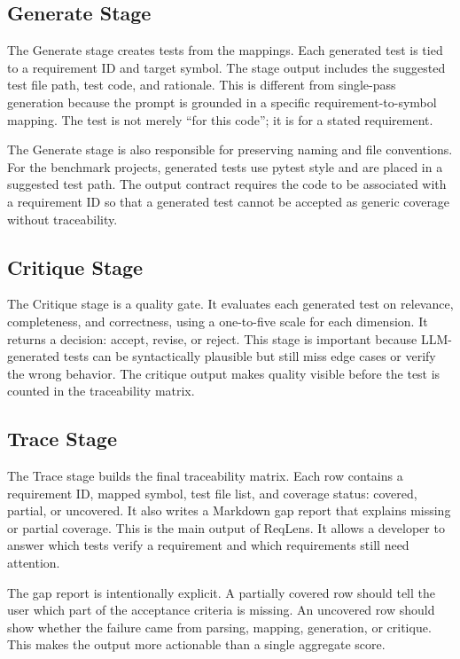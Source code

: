 \documentclass[conference]{IEEEtran}
\begin{document}
\subsection{Generate Stage}
The Generate stage creates tests from the mappings. Each generated test is tied
to a requirement ID and target symbol. The stage output includes the suggested
test file path, test code, and rationale. This is different from single-pass
generation because the prompt is grounded in a specific requirement-to-symbol
mapping. The test is not merely ``for this code''; it is for a stated
requirement.

The Generate stage is also responsible for preserving naming and file
conventions. For the benchmark projects, generated tests use pytest style and
are placed in a suggested test path. The output contract requires the code to
be associated with a requirement ID so that a generated test cannot be accepted
as generic coverage without traceability.

\subsection{Critique Stage}
The Critique stage is a quality gate. It evaluates each generated test on
relevance, completeness, and correctness, using a one-to-five scale for each
dimension. It returns a decision: accept, revise, or reject. This stage is
important because LLM-generated tests can be syntactically plausible but still
miss edge cases or verify the wrong behavior. The critique output makes quality
visible before the test is counted in the traceability matrix.

\subsection{Trace Stage}
The Trace stage builds the final traceability matrix. Each row contains a
requirement ID, mapped symbol, test file list, and coverage status: covered,
partial, or uncovered. It also writes a Markdown gap report that explains
missing or partial coverage. This is the main output of ReqLens. It allows a
developer to answer which tests verify a requirement and which requirements
still need attention.

The gap report is intentionally explicit. A partially covered row should tell
the user which part of the acceptance criteria is missing. An uncovered row
should show whether the failure came from parsing, mapping, generation, or
critique. This makes the output more actionable than a single aggregate score.
\end{document}
